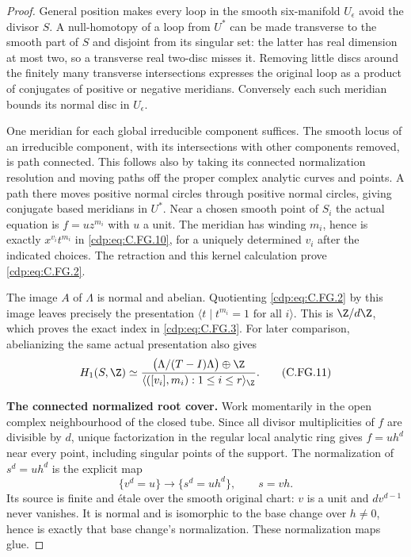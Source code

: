 \begin{proof}
General position makes every loop in the smooth six-manifold
$U_\epsilon$ avoid the divisor $S$. A null-homotopy of a loop from
$U^*$ can be made transverse to the smooth part of $S$ and disjoint
from its singular set: the latter has real dimension at most two,
so a transverse real two-disc misses it. Removing little discs
around the finitely many transverse intersections expresses the
original loop as a product of conjugates of positive or negative
meridians. Conversely each such meridian bounds its normal disc
in $U_\epsilon$.

One meridian for each global irreducible component suffices. The
smooth locus of an irreducible component, with its intersections
with other components removed, is path connected. This follows
also by taking its connected normalization resolution and moving
paths off the proper complex analytic curves and points. A path
there moves positive normal circles through positive normal circles,
giving conjugate based meridians in $U^*$. Near a chosen smooth
point of $S_i$ the actual equation is $f=u z^{m_i}$ with $u$ a
unit. The meridian has winding $m_i$, hence is exactly
$x^{v_i}t^{m_i}$ in \eqref{cdp:eq:C.FG.10}, for a uniquely determined $v_i$
after the indicated choices. The retraction and this kernel
calculation prove \eqref{cdp:eq:C.FG.2}.

The image $A$ of $\Lambda$ is normal and abelian. Quotienting
\eqref{cdp:eq:C.FG.2} by this image leaves precisely the presentation
$\langle t\mid t^{m_i}=1\text{ for all }i\rangle$.
This is $\Z/d\Z$, which proves the exact index in \eqref{cdp:eq:C.FG.3}.
For later comparison, abelianizing the same actual presentation
also gives
\[
 H_1(S,\Z)\simeq
 \frac{\bigl(\Lambda/(T-I)\Lambda\bigr)\oplus\Z}
      {\langle ([v_i],m_i):1\le i\le r\rangle_{\Z}}.
                                                        \tag{C.FG.11}\label{cdp:eq:C.FG.11}
\]

\par\medskip\noindent\textbf{The connected normalized root cover.}
Work momentarily in the open complex neighbourhood of the closed
tube. Since all divisor multiplicities of $f$ are divisible by
$d$, unique factorization in the regular local analytic ring
gives $f=u h^d$ near every point, including singular points of the
support. The normalization of $s^d=u h^d$ is the explicit map
\[
       \{v^d=u\}\longrightarrow\{s^d=u h^d\},
                         \qquad s=vh .                \tag{C.FG.12}\label{cdp:eq:C.FG.12}
\]
Its source is finite and \'etale over the smooth original chart:
$v$ is a unit and $d v^{d-1}$ never vanishes. It is normal and is
isomorphic to the base change over $h\ne0$, hence is exactly that
base change's normalization. These normalization maps glue.


\end{proof}
